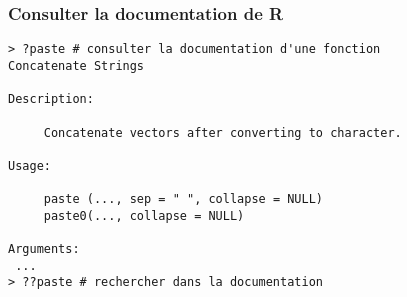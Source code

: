 \documentclass[10pt]{beamer}
\begin{document}
\begin{frame}[fragile]
  \frametitle{Consulter la documentation de R}

  \begin{lstlisting}
> ?paste # consulter la documentation d'une fonction
Concatenate Strings

Description:

     Concatenate vectors after converting to character.

Usage:

     paste (..., sep = " ", collapse = NULL)
     paste0(..., collapse = NULL)
     
Arguments:
 ...    
> ??paste # rechercher dans la documentation
  \end{lstlisting}
\end{frame}  






 \questionSlide

 \appendix
 \backupSlides

\end{document}
